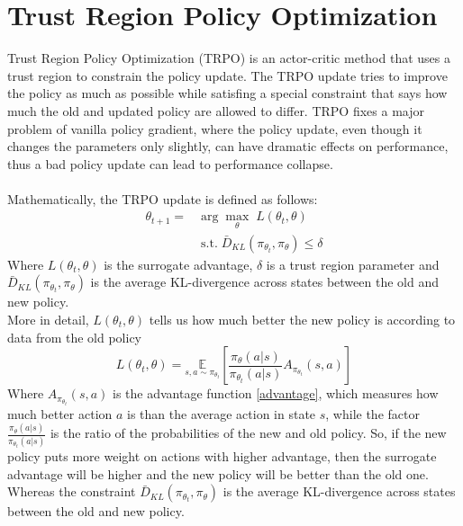 \section{Trust Region Policy Optimization}
Trust Region Policy Optimization (TRPO) \cite{schulman2015trust} is an actor-critic method that uses a trust region to constrain the policy update. The TRPO update tries to improve the policy as much as possible while satisfing a special constraint that says how much the old and updated policy are allowed to differ. TRPO fixes a major problem of vanilla policy gradient, where the policy update, even though it changes the parameters only slightly, can have dramatic effects on performance, thus a bad policy update can lead to performance collapse.\\\\
Mathematically, the TRPO update is defined as follows:
\begin{equation}
    \begin{split}
        \theta_{t+1} = & \arg\max_{\theta} \; L(\theta_t, \theta)\\
        & \; \text{s.t.} \; \bar D_{KL}(\pi_{\theta_t}, \pi_{\theta}) \leq \delta
    \end{split}
    \label{eq:trpo-update}
\end{equation}
Where $L(\theta_t, \theta)$ is the surrogate advantage, $\delta$ is a trust region parameter and $\bar D_{KL}(\pi_{\theta_t}, \pi_{\theta})$ is the average KL-divergence across states between the old and new policy.\\
More in detail, $L(\theta_t, \theta)$ tells us how much better the new policy is according to data from the old policy
\begin{equation}
    L(\theta_t, \theta) = \underset{s, a \sim \pi_{\theta_t}}{\mathbb{E}} \left[ \frac{\pi_{\theta}(a|s)}{\pi_{\theta_t}(a|s)} A_{\pi_{\theta_t}}(s, a) \right]
    \label{eq:surrogate-advantage}
\end{equation}
Where $A_{\pi_{\theta_t}}(s, a)$ is the advantage function \eqref{advantage}, which measures how much better action $a$ is than the average action in state $s$, while the factor $\frac{\pi_{\theta}(a|s)}{\pi_{\theta_t}(a|s)}$ is the ratio of the probabilities of the new and old policy. So, if the new policy puts more weight on actions with higher advantage, then the surrogate advantage will be higher and the new policy will be better than the old one.\\
Whereas the constraint $\bar D_{KL}(\pi_{\theta_t}, \pi_{\theta})$ is the average KL-divergence across states between the old and new policy.
